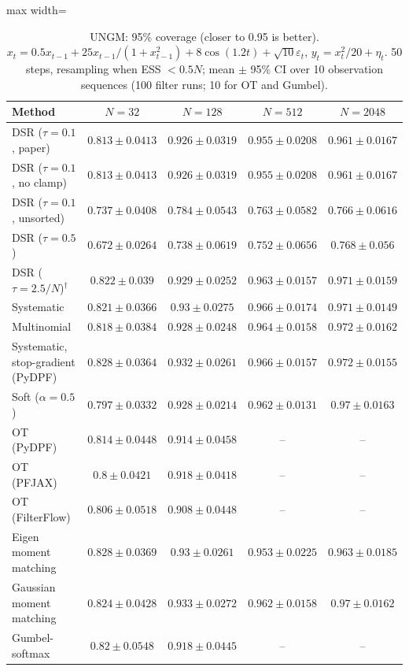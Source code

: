 \begin{table}[H]
\centering
\small
\caption{UNGM: 95\% coverage (closer to 0.95 is better). $x_t=0.5x_{t-1}+25x_{t-1}/(1+x_{t-1}^2)+8\cos(1.2t)+\sqrt{10}\varepsilon_t$, $y_t=x_t^2/20+\eta_t$. 50 steps, resampling when ESS $<0.5N$; mean $\pm$ 95\% CI over 10 observation sequences (100 filter runs; 10 for OT and Gumbel).}
\label{tab:ungm-coverage95}
\begin{adjustbox}{max width=\linewidth}
\begin{tabular}{lcccc}
\toprule
Method & $N{=}32$ & $N{=}128$ & $N{=}512$ & $N{=}2048$ \\
\midrule
DSR ($\tau{=}0.1$, paper) & $0.813\pm0.0413$ & $0.926\pm0.0319$ & $0.955\pm0.0208$ & $\mathbf{0.961\pm0.0167}$ \\
DSR ($\tau{=}0.1$, no clamp) & $0.813\pm0.0413$ & $0.926\pm0.0319$ & $0.955\pm0.0208$ & $\mathbf{0.961\pm0.0167}$ \\
DSR ($\tau{=}0.1$, unsorted) & $0.737\pm0.0408$ & $0.784\pm0.0543$ & $0.763\pm0.0582$ & $0.766\pm0.0616$ \\
DSR ($\tau{=}0.5$) & $0.672\pm0.0264$ & $0.738\pm0.0619$ & $0.752\pm0.0656$ & $0.768\pm0.056$ \\
DSR ($\tau{=}2.5/N$)$^\dagger$ & $0.822\pm0.039$ & $0.929\pm0.0252$ & $0.963\pm0.0157$ & $0.971\pm0.0159$ \\
\midrule
Systematic & $0.821\pm0.0366$ & $0.93\pm0.0275$ & $0.966\pm0.0174$ & $0.971\pm0.0149$ \\
Multinomial & $0.818\pm0.0384$ & $0.928\pm0.0248$ & $0.964\pm0.0158$ & $0.972\pm0.0162$ \\
Systematic, stop-gradient (PyDPF) & $\mathbf{0.828\pm0.0364}$ & $0.932\pm0.0261$ & $0.966\pm0.0157$ & $0.972\pm0.0155$ \\
Soft ($\alpha{=}0.5$) & $0.797\pm0.0332$ & $0.928\pm0.0214$ & $0.962\pm0.0131$ & $0.97\pm0.0163$ \\
OT (PyDPF) & $0.814\pm0.0448$ & $0.914\pm0.0458$ & -- & -- \\
OT (PFJAX) & $0.8\pm0.0421$ & $0.918\pm0.0418$ & -- & -- \\
OT (FilterFlow) & $0.806\pm0.0518$ & $0.908\pm0.0448$ & -- & -- \\
Eigen moment matching & $0.828\pm0.0369$ & $0.93\pm0.0261$ & $\mathbf{0.953\pm0.0225}$ & $0.963\pm0.0185$ \\
Gaussian moment matching & $0.824\pm0.0428$ & $\mathbf{0.933\pm0.0272}$ & $0.962\pm0.0158$ & $0.97\pm0.0162$ \\
Gumbel-softmax & $0.82\pm0.0548$ & $0.918\pm0.0445$ & -- & -- \\

\end{tabular}
\end{adjustbox}
\end{table}
